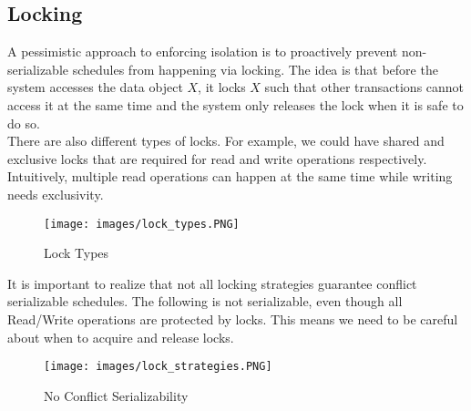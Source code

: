 \subsection{Locking}
A pessimistic approach to enforcing isolation is to proactively prevent non-serializable schedules from happening via locking. The idea is that before the system accesses the data object $X$, it locks $X$ such that other transactions cannot access it at the same time and the system only releases the lock when it is safe to do so.\\
There are also different types of locks. For example, we could have shared and exclusive locks that are required for read and write operations respectively. Intuitively, multiple read operations can happen at the same time while writing needs exclusivity.
\begin{figure}[H]
\centering
\texttt{[image: images/lock\_types.PNG]}
\label{lock_types}
\caption{Lock Types}
\end{figure}
It is important to realize that not all locking strategies guarantee conflict serializable schedules. The following is not serializable, even though all Read/Write operations are protected by locks. This means we need to be careful about when to acquire and release locks.
\begin{figure}[H]
\centering
\texttt{[image: images/lock\_strategies.PNG]}
\label{lock_strategies}
\caption{No Conflict Serializability}
\end{figure}

